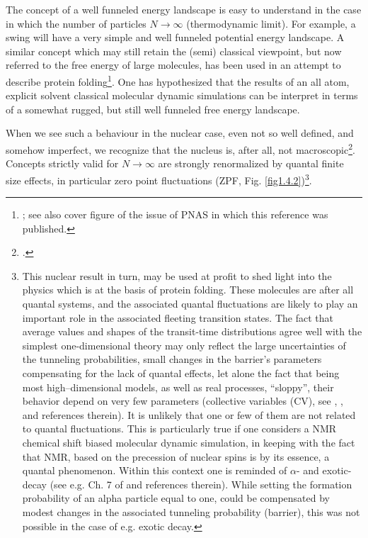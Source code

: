  
 
 The concept of a well funneled energy landscape  is easy to understand in the case in which the number of particles $N\rightarrow \infty$ (thermodynamic limit). For example, a swing will have a very simple and well funneled potential energy landscape. A similar concept which may still retain the (semi) classical viewpoint, but now referred to the free energy of large molecules, has been used in an attempt to describe protein folding\footnote{\cite{Wolynes:16,Wolynes:12}; see also cover figure of the issue of PNAS in which this reference was published.}. One has hypothesized that the results of an all atom, explicit solvent classical molecular dynamic simulations can be interpret in terms of a somewhat rugged, but still well funneled free energy landscape.

When we see such a behaviour in the nuclear case, even not so well defined, and somehow imperfect, we recognize that the nucleus is, after all, not macroscopic\footnote{\cite{Anderson:72}.}. Concepts strictly valid for $N\rightarrow\infty$ are strongly renormalized by quantal finite size effects, in particular zero point fluctuations (ZPF, Fig. \ref{fig1.4.2})\footnote{This nuclear result in turn, may be used at profit to shed light into the physics which is at the basis of protein folding. These molecules are after all quantal systems, and the associated quantal fluctuations are likely to play an important role in the associated fleeting transition states. The fact that average values and shapes of the transit-time distributions agree well with the simplest one-dimensional theory may only reflect the large uncertainties of the tunneling probabilities, small changes in the barrier's parameters compensating for the lack of quantal effects, let alone the fact that being most high--dimensional models, as well as real processes, ``sloppy'', their behavior depend on very few parameters (collective variables (CV), see \cite{Buchanan:15}, \cite{Transtrum:15}, and references therein). It is unlikely that one or few of them are not  related to quantal fluctuations. This is particularly true if one considers a NMR chemical shift biased molecular dynamic simulation, in keeping with the fact that NMR, based  on the precession of nuclear spins is by its essence, a quantal phenomenon. Within this context one is reminded of $\alpha$- and exotic-decay (see e.g. Ch. 7 of \cite{Brink:05} and references therein). While setting the formation probability of an alpha particle equal to one, could be compensated by modest changes in the associated tunneling probability (barrier), this was not possible in the case of e.g. exotic decay.}.

